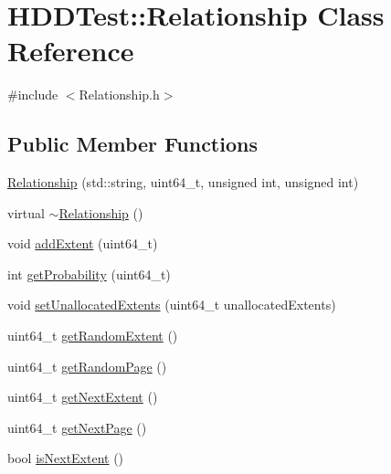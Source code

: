 \hypertarget{class_h_d_d_test_1_1_relationship}{\section{H\-D\-D\-Test\-:\-:Relationship Class Reference}
\label{class_h_d_d_test_1_1_relationship}
}


{\ttfamily \#include $<$Relationship.\-h$>$}

\subsection*{Public Member Functions}
\begin{DoxyCompactItemize}
\item 
\hyperlink{class_h_d_d_test_1_1_relationship_a60844c9f3d6bbc244e84fccaace8f8ce}{Relationship} (std\-::string, uint64\-\_\-t, unsigned int, unsigned int)
\item 
virtual \hyperlink{class_h_d_d_test_1_1_relationship_a57554a697ebd4128d471dc3a103020c6}{$\sim$\-Relationship} ()
\item 
void \hyperlink{class_h_d_d_test_1_1_relationship_afcafd9d406a021206887787f43453188}{add\-Extent} (uint64\-\_\-t)
\item 
int \hyperlink{class_h_d_d_test_1_1_relationship_a2f4a99590b8ce3522158ac30ab9adf2f}{get\-Probability} (uint64\-\_\-t)
\item 
void \hyperlink{class_h_d_d_test_1_1_relationship_a2ed606e57f4d5e3acbb3b0d905d1938e}{set\-Unallocated\-Extents} (uint64\-\_\-t unallocated\-Extents)
\item 
uint64\-\_\-t \hyperlink{class_h_d_d_test_1_1_relationship_af752170ba4eb288adf7e3cc04ce274a9}{get\-Random\-Extent} ()
\item 
uint64\-\_\-t \hyperlink{class_h_d_d_test_1_1_relationship_af1efe5fc2eda8fc97af447db84247c1f}{get\-Random\-Page} ()
\item 
uint64\-\_\-t \hyperlink{class_h_d_d_test_1_1_relationship_a8e9549c7ca201f7b3bf0efec375c52e2}{get\-Next\-Extent} ()
\item 
uint64\-\_\-t \hyperlink{class_h_d_d_test_1_1_relationship_a6366d75c0a634b72b8235f46d0a20793}{get\-Next\-Page} ()
\item 
bool \hyperlink{class_h_d_d_test_1_1_relationship_a53966cb62025f69c97a18919e83b98c0}{is\-Next\-Extent} ()
\end{DoxyCompactItemize}
